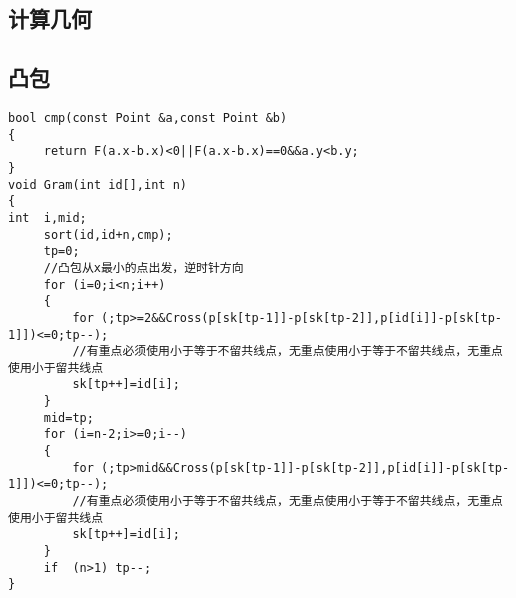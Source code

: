 \documentclass{article}
\begin{document}
\begin{CJK*}{UTF8}{song}
\section{计算几何}
\subsection{凸包}
\begin{lstlisting}
bool cmp(const Point &a,const Point &b)
{
     return F(a.x-b.x)<0||F(a.x-b.x)==0&&a.y<b.y;
}
void Gram(int id[],int n)
{
int  i,mid;
     sort(id,id+n,cmp);
     tp=0;
     //凸包从x最小的点出发，逆时针方向
     for (i=0;i<n;i++)
     {
         for (;tp>=2&&Cross(p[sk[tp-1]]-p[sk[tp-2]],p[id[i]]-p[sk[tp-1]])<=0;tp--);
         //有重点必须使用小于等于不留共线点，无重点使用小于等于不留共线点，无重点使用小于留共线点
         sk[tp++]=id[i];
     }
     mid=tp;
     for (i=n-2;i>=0;i--)
     {
         for (;tp>mid&&Cross(p[sk[tp-1]]-p[sk[tp-2]],p[id[i]]-p[sk[tp-1]])<=0;tp--);
         //有重点必须使用小于等于不留共线点，无重点使用小于等于不留共线点，无重点使用小于留共线点
         sk[tp++]=id[i];
     }
     if  (n>1) tp--;
}
\end{lstlisting}

\end{CJK*}
\end{document}
